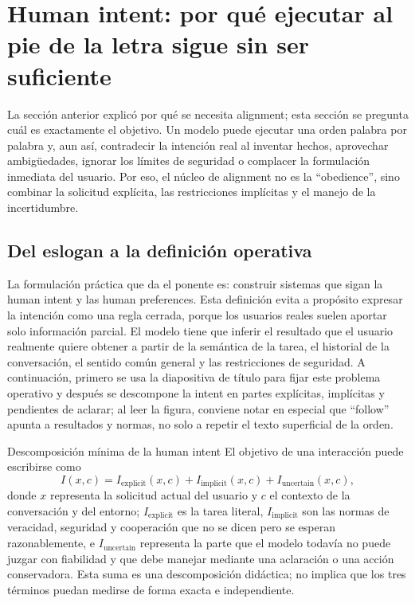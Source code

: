\section{Human intent: por qué ejecutar al pie de la letra sigue sin ser suficiente}

La sección anterior explicó por qué se necesita alignment; esta sección se pregunta cuál es exactamente el objetivo. Un modelo puede ejecutar una orden palabra por palabra y, aun así, contradecir la intención real al inventar hechos, aprovechar ambigüedades, ignorar los límites de seguridad o complacer la formulación inmediata del usuario. Por eso, el núcleo de alignment no es la ``obedience'', sino combinar la solicitud explícita, las restricciones implícitas y el manejo de la incertidumbre.

\subsection{Del eslogan a la definición operativa}

La formulación práctica que da el ponente es: construir sistemas que sigan la human intent y las human preferences. Esta definición evita a propósito expresar la intención como una regla cerrada, porque los usuarios reales suelen aportar solo información parcial. El modelo tiene que inferir el resultado que el usuario realmente quiere obtener a partir de la semántica de la tarea, el historial de la conversación, el sentido común general y las restricciones de seguridad. A continuación, primero se usa la diapositiva de título para fijar este problema operativo y después se descompone la intent en partes explícitas, implícitas y pendientes de aclarar; al leer la figura, conviene notar en especial que ``follow'' apunta a resultados y normas, no solo a repetir el texto superficial de la orden.


\begin{importantbox}{Descomposición mínima de la human intent}
El objetivo de una interacción puede escribirse como
\[
I(x,c)=I_{\mathrm{explicit}}(x,c)+I_{\mathrm{implicit}}(x,c)+I_{\mathrm{uncertain}}(x,c),
\]
donde $x$ representa la solicitud actual del usuario y $c$ el contexto de la conversación y del entorno; $I_{\mathrm{explicit}}$ es la tarea literal, $I_{\mathrm{implicit}}$ son las normas de veracidad, seguridad y cooperación que no se dicen pero se esperan razonablemente, e $I_{\mathrm{uncertain}}$ representa la parte que el modelo todavía no puede juzgar con fiabilidad y que debe manejar mediante una aclaración o una acción conservadora. Esta suma es una descomposición didáctica; no implica que los tres términos puedan medirse de forma exacta e independiente.
\end{importantbox}

